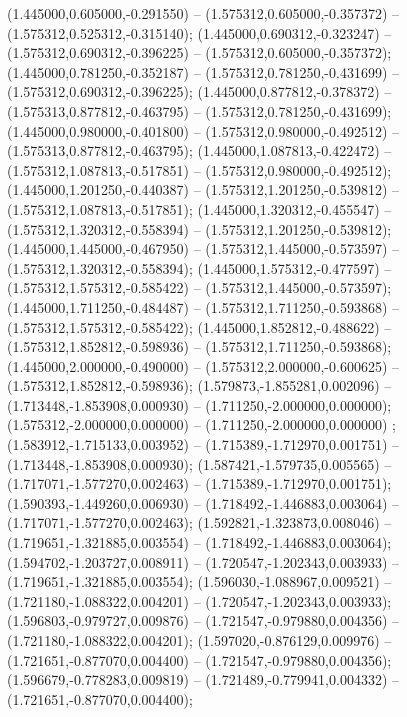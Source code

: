  (1.445000,0.605000,-0.291550) -- (1.575312,0.605000,-0.357372) -- (1.575312,0.525312,-0.315140);
 (1.445000,0.690312,-0.323247) -- (1.575312,0.690312,-0.396225) -- (1.575312,0.605000,-0.357372);
 (1.445000,0.781250,-0.352187) -- (1.575312,0.781250,-0.431699) -- (1.575312,0.690312,-0.396225);
 (1.445000,0.877812,-0.378372) -- (1.575313,0.877812,-0.463795) -- (1.575312,0.781250,-0.431699);
 (1.445000,0.980000,-0.401800) -- (1.575312,0.980000,-0.492512) -- (1.575313,0.877812,-0.463795);
 (1.445000,1.087813,-0.422472) -- (1.575312,1.087813,-0.517851) -- (1.575312,0.980000,-0.492512);
 (1.445000,1.201250,-0.440387) -- (1.575312,1.201250,-0.539812) -- (1.575312,1.087813,-0.517851);
 (1.445000,1.320312,-0.455547) -- (1.575312,1.320312,-0.558394) -- (1.575312,1.201250,-0.539812);
 (1.445000,1.445000,-0.467950) -- (1.575312,1.445000,-0.573597) -- (1.575312,1.320312,-0.558394);
 (1.445000,1.575312,-0.477597) -- (1.575312,1.575312,-0.585422) -- (1.575312,1.445000,-0.573597);
 (1.445000,1.711250,-0.484487) -- (1.575312,1.711250,-0.593868) -- (1.575312,1.575312,-0.585422);
 (1.445000,1.852812,-0.488622) -- (1.575312,1.852812,-0.598936) -- (1.575312,1.711250,-0.593868);
 (1.445000,2.000000,-0.490000) -- (1.575312,2.000000,-0.600625) -- (1.575312,1.852812,-0.598936);
 (1.579873,-1.855281,0.002096) -- (1.713448,-1.853908,0.000930) -- (1.711250,-2.000000,0.000000);
 (1.575312,-2.000000,0.000000) -- (1.711250,-2.000000,0.000000) ;
 (1.583912,-1.715133,0.003952) -- (1.715389,-1.712970,0.001751) -- (1.713448,-1.853908,0.000930);
 (1.587421,-1.579735,0.005565) -- (1.717071,-1.577270,0.002463) -- (1.715389,-1.712970,0.001751);
 (1.590393,-1.449260,0.006930) -- (1.718492,-1.446883,0.003064) -- (1.717071,-1.577270,0.002463);
 (1.592821,-1.323873,0.008046) -- (1.719651,-1.321885,0.003554) -- (1.718492,-1.446883,0.003064);
 (1.594702,-1.203727,0.008911) -- (1.720547,-1.202343,0.003933) -- (1.719651,-1.321885,0.003554);
 (1.596030,-1.088967,0.009521) -- (1.721180,-1.088322,0.004201) -- (1.720547,-1.202343,0.003933);
 (1.596803,-0.979727,0.009876) -- (1.721547,-0.979880,0.004356) -- (1.721180,-1.088322,0.004201);
 (1.597020,-0.876129,0.009976) -- (1.721651,-0.877070,0.004400) -- (1.721547,-0.979880,0.004356);
 (1.596679,-0.778283,0.009819) -- (1.721489,-0.779941,0.004332) -- (1.721651,-0.877070,0.004400);
